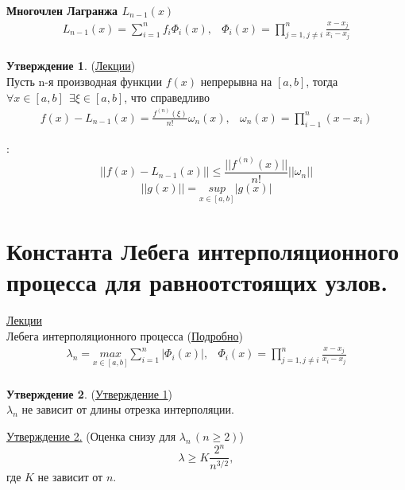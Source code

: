 \documentclass[specialist, subf, href, colorlinks=true, 12pt, times, mtpro, final]{disser}
\theoremstyle{definition}
\newtheorem{state}{Утверждение}[section]
\begin{document}
	\noindent\textbf{Многочлен Лагранжа $L_{n - 1}(x)$}
	$$
		\begin {array}{lr}
		L_{n - 1}(x) = \sum\limits_{i = 1}^{n} f_i \Phi_i (x), & \Phi_i(x) = \prod\limits_{j = 1, j\ne i}^{n} \frac{x-x_j}{x_i - x_j} \\
		\end {array}
	$$

	\begin{state} (\hyperlink {lects.16}{Лекции})\\
	Пусть n-я производная функции $f(x)$ непрерывна на $[a,b]$, тогда $\forall x \in [a,b] \ \  \exists \xi \in [a,b]$, что справедливо
		$$
			\begin{array}{lr}
			f(x) - L_{n-1}(x) = \frac {f^{(n)}(\xi)}{n!} \omega_n(x), & \omega_n(x) = \prod\limits_{i - 1}^{n}(x-x_i)
			\end{array}
		$$
	\end{state}
	:
	$$
		||f(x) - L_{n-1}(x) || \le \frac{||f^{(n)}(x)||}{n!} ||\omega_n||
	$$
	$$
		||g(x)|| = \underset{x\in [a,b]}{sup} |g(x)|
	$$


\section {Константа Лебега интерполяционного процесса для равноотстоящих узлов.}
	\hyperlink {lects.17}{Лекции}\\
	{ Лебега интерполяционного процесса} (\hyperlink {lects.17}{Подробно})
	$$
		\begin{array}{lr}
		\lambda_n = \underset{x\in [a,b]}{max} \sum\limits_{i = 1}^n |\Phi_i(x)|, & \Phi_i(x) = \prod\limits_{j = 1, j\ne i}^{n} \frac{x-x_j}{x_i - x_j} \\
		\end{array}
	$$
	
	\begin{state} (\hyperlink {lects.17}{Утверждение 1})\\
	$\lambda_n$ не зависит от длины отрезка интерполяции.
	\end{state}
	
	\noindent \hyperlink{lects.17}{Утверждение 2.} (Оценка снизу для $\lambda_n\,(n\ge 2)$)
	$$
		\lambda \ge K \frac {2^n}{n^{3/2}}, 
	$$ 
	где $K$ не зависит от $n$. \\
	
\end{document}
